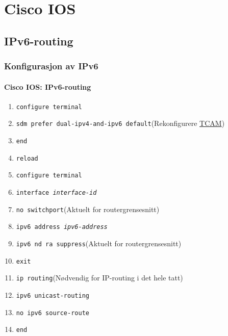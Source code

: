 \section{Cisco IOS}
\subsection{IPv6-routing}
\begin{frame}%
  \frametitle{Konfigurasjon av IPv6}
  \framesubtitle{Cisco IOS: IPv6-routing}
  \pause
  \begin{enumerate}[<+->]
  \item \texttt{configure terminal}
  \item \alert{\texttt{sdm prefer dual-ipv4-and-ipv6 default}}\hfill(Rekonfigurere \href{http://en.wikipedia.org/wiki/Content-addressable_memory}{TCAM})
  \item \texttt{end}
  \item \texttt{reload}
  \item \texttt{configure terminal}
  \item \texttt{interface \textit{interface-id}}
  \item \texttt{no switchport}\hfill(Aktuelt for routergrensesnitt)
  \item \alert{\texttt{ipv6 address \textit{ipv6-address}}}
  \item \texttt{ipv6 nd ra suppress}\hfill(Aktuelt for routergrensesnitt)
  \item \texttt{exit}
  \item \alert{\texttt{ip routing}}\hfill(Nødvendig for IP-routing i det hele tatt)
  \item \alert{\texttt{ipv6 unicast-routing}}
  \item \texttt{no ipv6 source-route}
  \item \texttt{end}
  \end{enumerate}
\end{frame}

